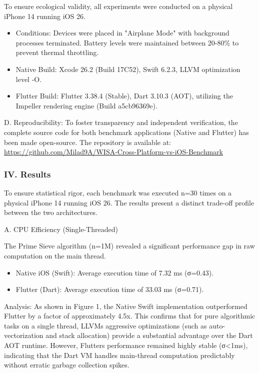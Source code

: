 \documentclass[
]{article}
\begin{document}
To ensure ecological validity, all experiments were conducted on a
physical iPhone 14 running iOS 26.

\begin{itemize}
\item
  Conditions: Devices were placed in "Airplane Mode" with background
  processes terminated. Battery levels were maintained between 20-80\%
  to prevent thermal throttling.
\item
  Native Build: Xcode 26.2 (Build 17C52), Swift 6.2.3, LLVM optimization
  level -O.
\item
  Flutter Build: Flutter 3.38.4 (Stable), Dart 3.10.3 (AOT), utilizing
  the Impeller rendering engine (Build a5cb96369e).
\end{itemize}

D. Reproducibility: To foster transparency and independent verification,
the complete source code for both benchmark applications (Native and
Flutter) has been made open-source. The repository is available at:
\href{https://github.com/Milad9A/WISA-Cross-Platform-vs-iOS-Benchmark}{\ul{https://github.com/Milad9A/WISA-Cross-Platform-vs-iOS-Benchmark}}

\subsubsection{\texorpdfstring{\textbf{IV.
Results}}{IV. Results}}\label{iv.-results}

To ensure statistical rigor, each benchmark was executed n=30 times on a
physical iPhone 14 running iOS 26. The results present a distinct
trade-off profile between the two architectures.

A. CPU Efficiency (Single-Threaded)

The Prime Sieve algorithm (n=1M) revealed a significant performance gap
in raw computation on the main thread.

\begin{itemize}
\item
  Native iOS (Swift): Average execution time of 7.32 ms (σ=0.43).
\item
  Flutter (Dart): Average execution time of 33.03 ms (σ=0.71).
\end{itemize}

Analysis: As shown in Figure 1, the Native Swift implementation
outperformed Flutter by a factor of approximately 4.5x. This confirms
that for pure algorithmic tasks on a single thread,
LLVM\textquotesingle s aggressive optimizations (such as
auto-vectorization and stack allocation) provide a substantial advantage
over the Dart AOT runtime. However, Flutter\textquotesingle s
performance remained highly stable (σ\textless1ms), indicating that the
Dart VM handles main-thread computation predictably without erratic
garbage collection spikes.
\end{document}
